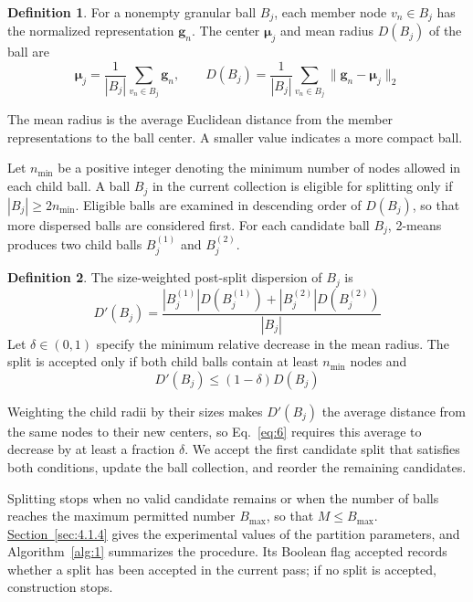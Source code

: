 \documentclass[10pt,letterpaper,nopreprintline]{elsarticle}
\theoremstyle{definition}
\newtheorem{definition}{Definition}
\theoremstyle{plain}
\begin{document}
\Needspace{64pt}
\begin{definition}
For a nonempty granular ball \(B_j\), each member node \(v_n\in B_j\) has the normalized representation \(\mathbf g_n\). The center \(\boldsymbol\mu_j\) and mean radius \(D(B_j)\) of the ball are
\begin{equation}\label{eq:4}
\boldsymbol\mu_j=\frac{1}{|B_j|}\sum_{v_n\in B_j}\mathbf g_n,
\qquad D(B_j)=\frac{1}{|B_j|}\sum_{v_n\in B_j}\|\mathbf g_n-\boldsymbol\mu_j\|_2
\end{equation}
\end{definition}

The mean radius is the average Euclidean distance from the member representations to the ball center. A smaller value indicates a more compact ball.

\Needspace{64pt}

Let \(n_{\min}\) be a positive integer denoting the minimum number of nodes allowed in each child ball. A ball \(B_j\) in the current collection is eligible for splitting only if \(|B_j|\geq 2n_{\min}\). Eligible balls are examined in descending order of \(D(B_j)\), so that more dispersed balls are considered first. For each candidate ball \(B_j\), 2-means produces two child balls \(B_j^{(1)}\) and \(B_j^{(2)}\).

\begin{definition}
The size-weighted post-split dispersion of \(B_j\) is
\begin{equation}\label{eq:5}
D'(B_j) = \frac{|B_j^{(1)}|D(B_j^{(1)}) + |B_j^{(2)}|D(B_j^{(2)})}{|B_j|}
\end{equation}
Let \(\delta \in (0,1)\) specify the minimum relative decrease in the mean radius. The split is accepted only if both child balls contain at least \(n_{\min}\) nodes and
\begin{equation}\label{eq:6}
D'(B_j) \leq (1 - \delta)D(B_j)
\end{equation}
\end{definition}

Weighting the child radii by their sizes makes \(D'(B_j)\) the average distance from the same nodes to their new centers, so Eq.~\eqref{eq:6} requires this average to decrease by at least a fraction \(\delta\). We accept the first candidate split that satisfies both conditions, update the ball collection, and reorder the remaining candidates.

Splitting stops when no valid candidate remains or when the number of balls reaches the maximum permitted number \(B_{\max}\), so that \(M\leq B_{\max}\). \hyperref[sec:4.1.4]{Section~\ref*{sec:4.1.4}} gives the experimental values of the partition parameters, and Algorithm~\ref{alg:1} summarizes the procedure. Its Boolean flag \(\mathrm{accepted}\) records whether a split has been accepted in the current pass; if no split is accepted, construction stops.
\end{document}
